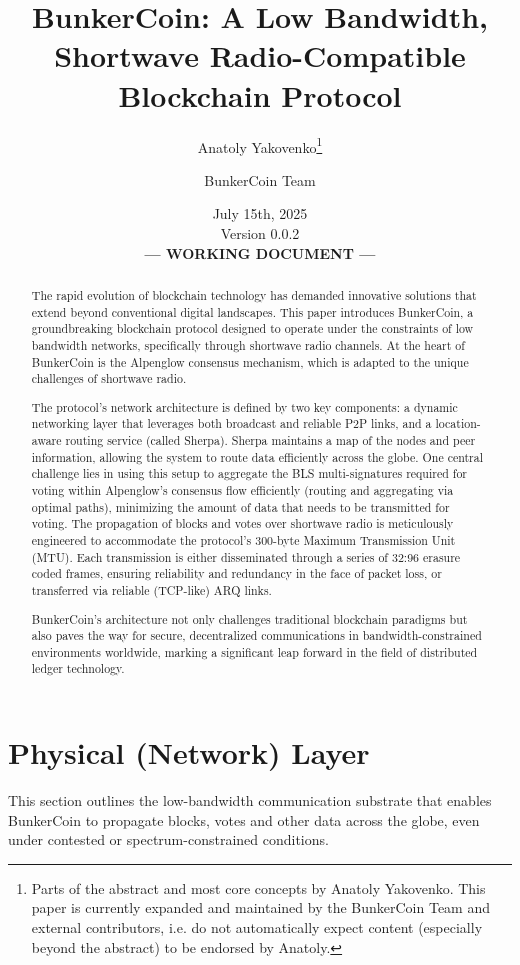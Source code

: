 \documentclass{article}
\title{BunkerCoin: A Low Bandwidth, Shortwave Radio-Compatible Blockchain Protocol}
\author{Anatoly Yakovenko\thanks{Parts of the abstract and most core concepts by Anatoly Yakovenko. This paper is currently expanded and maintained by the BunkerCoin Team and external contributors, i.e. do not automatically expect content (especially beyond the abstract) to be endorsed by Anatoly.} \and BunkerCoin Team}
\date{July 15th, 2025\\Version 0.0.2 \\[1em] \textbf{--- WORKING DOCUMENT ---}}
\begin{document}
\maketitle

\begin{abstract}
The rapid evolution of blockchain technology has demanded innovative solutions that extend beyond conventional digital landscapes. This paper introduces BunkerCoin, a groundbreaking blockchain protocol designed to operate under the constraints of low bandwidth networks, specifically through shortwave radio channels. At the heart of BunkerCoin is the Alpenglow consensus mechanism, which is adapted to the unique challenges of shortwave radio. 

The protocol's network architecture is defined by two key components: a dynamic networking layer that leverages both broadcast and reliable P2P links, and a location-aware routing service (called Sherpa). Sherpa maintains a map of the nodes and peer information, allowing the system to route data efficiently across the globe. One central challenge lies in using this setup to aggregate the BLS multi-signatures required for voting within Alpenglow's consensus flow efficiently (routing and aggregating via optimal paths), minimizing the amount of data that needs to be transmitted for voting. The propagation of blocks and votes over shortwave radio is meticulously engineered to accommodate the protocol's 300-byte Maximum Transmission Unit (MTU). Each transmission is either disseminated through a series of 32:96 erasure coded frames, ensuring reliability and redundancy in the face of packet loss, or transferred via reliable  (TCP-like) ARQ links.

BunkerCoin's architecture not only challenges traditional blockchain paradigms but also paves the way for secure, decentralized communications in bandwidth-constrained environments worldwide, marking a significant leap forward in the field of distributed ledger technology.
\end{abstract}

\section{Physical (Network) Layer}
\label{sec:physical}

This section outlines the low-bandwidth communication substrate that enables BunkerCoin to propagate blocks, votes and other data across the globe, even under contested or spectrum-constrained conditions.
\end{document}
